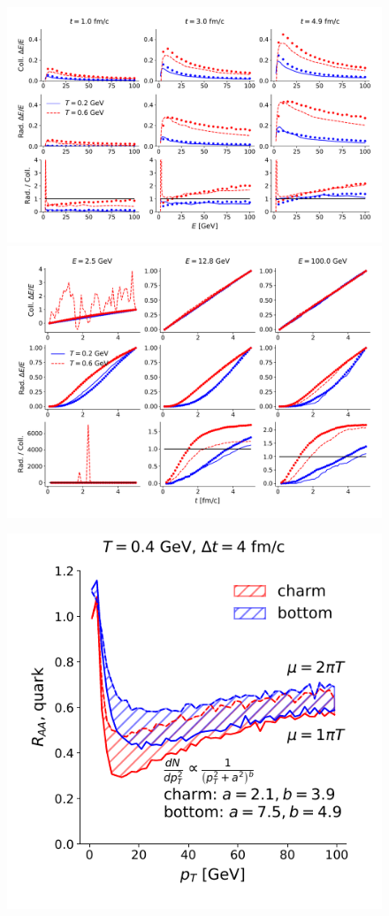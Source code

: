 \documentclass[aps, prc, reprint, amsmath, groupedaddress, nofootinbib]{revtex4-1}
\begin{document}
\begin{figure}
\includegraphics[width=\textwidth]{E_Eloss.pdf}\\
\includegraphics[width=\textwidth]{L_Eloss.pdf}
\end{figure}

\begin{figure}
\includegraphics[width=\columnwidth]{Box_Raa.pdf}
\end{figure}
\end{document}
